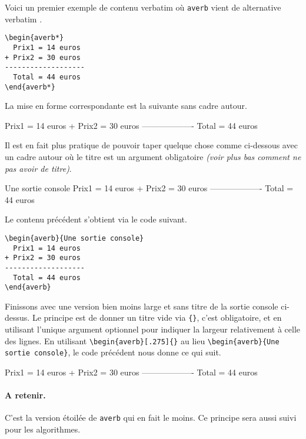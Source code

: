 Voici un premier exemple de contenu verbatim où \verb+averb+ vient de \og alternative verbatim \fg. 

\begin{frame-gene}
	\small
	\begin{verbatim}
\begin{averb*}
  Prix1 = 14 euros
+ Prix2 = 30 euros
-------------------
  Total = 44 euros
\end{averb*} 
	\end{verbatim}
\end{frame-gene}


La mise en forme correspondante est la suivante sans cadre autour.

\begin{frame-gene}
	\begin{averb*}
  Prix1 = 14 euros
+ Prix2 = 30 euros
-------------------
  Total = 44 euros
	\end{averb*} 
\end{frame-gene}


\medskip


Il est en fait plus pratique de pouvoir taper quelque chose comme ci-dessous avec un cadre autour où le titre est un argument obligatoire \emph{(voir plus bas comment ne pas avoir de titre)}.

\begin{averb}{Une sortie console}
  Prix1 = 14 euros
+ Prix2 = 30 euros
-------------------
  Total = 44 euros
\end{averb} 


Le contenu précédent s'obtient via le code suivant.

\begin{frame-gene}
	\small
	\begin{verbatim}
\begin{averb}{Une sortie console}
  Prix1 = 14 euros
+ Prix2 = 30 euros
-------------------
  Total = 44 euros
\end{averb} 
	\end{verbatim} 
\end{frame-gene}


Finissons avec une version bien moins large et sans titre de la sortie console ci-dessus. Le principe est de donner un titre vide via \verb+{}+, c'est obligatoire, et en utilisant l'unique argument optionnel pour indiquer la largeur relativement à celle des lignes. En utilisant \verb+\begin{averb}[.275]{}+ au lieu \verb+\begin{averb}{Une sortie console}+, le code précédent nous donne ce qui suit.


\begin{averb}[.275]{}
  Prix1 = 14 euros
+ Prix2 = 30 euros
-------------------
  Total = 44 euros
\end{averb} 


\paragraph{A retenir.} C'est la version étoilée de \verb+averb+ qui en fait le moins. Ce principe sera aussi suivi pour les algorithmes.
